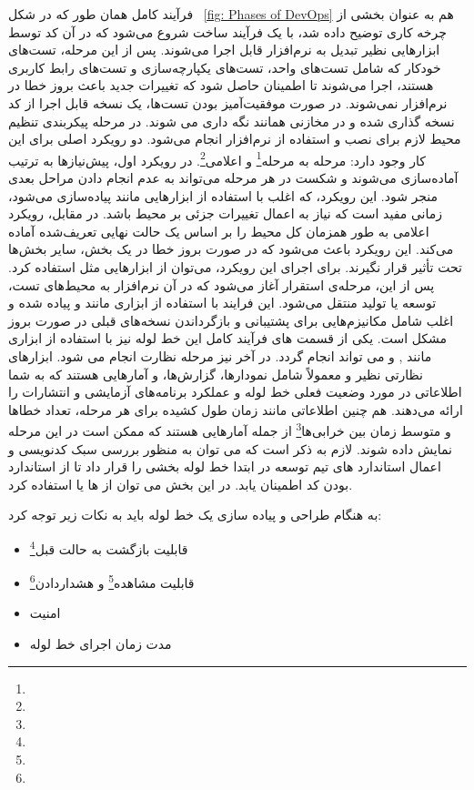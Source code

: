 فرآیند کامل  همان طور که در شکل
~\ref{fig: Phases of DevOps}
هم به عنوان بخشی از چرخه کاری توضیح داده شد، با یک فرآیند ساخت شروع می‌شود که در آن کد توسط ابزارهایی نظیر  تبدیل به نرم‌افزار قابل اجرا می‌شوند. پس از این مرحله، تست‌های خودکار که شامل تست‌های واحد، تست‌های یکپارچه‌سازی و تست‌های رابط کاربری هستند، اجرا می‌شوند تا اطمینان حاصل شود که تغییرات جدید باعث بروز خطا در نرم‌افزار نمی‌شوند. در صورت موفقیت‌آمیز بودن تست‌ها، یک نسخه قابل اجرا از کد نسخه گذاری شده و در مخازنی همانند  نگه داری می شوند. 
در مرحله پیکربندی تنظیم محیط لازم برای نصب و استفاده از نرم‌افزار انجام می‌شود. دو رویکرد اصلی برای این کار وجود دارد: مرحله به مرحله\footnote{} و اعلامی\footnote{ }. در رویکرد اول، پیش‌نیازها به ترتیب آماده‌سازی می‌شوند و شکست در هر مرحله می‌تواند به عدم انجام دادن مراحل بعدی منجر شود. این رویکرد، که اغلب با استفاده از ابزارهایی مانند  پیاده‌سازی می‌شود، زمانی مفید است که نیاز به اعمال تغییرات جزئی بر محیط باشد. در مقابل، رویکرد اعلامی به طور همزمان کل محیط را بر اساس یک حالت نهایی تعریف‌شده آماده می‌کند. این رویکرد باعث می‌شود که در صورت بروز خطا در یک بخش، سایر بخش‌ها تحت تأثیر قرار نگیرند. برای اجرای این رویکرد، می‌توان از ابزارهایی مثل  استفاده کرد.
پس از این، مرحله‌ی استقرار آغاز می‌شود که در آن نرم‌افزار به محیط‌های تست،  توسعه یا تولید منتقل می‌شود. این فرایند با استفاده از ابزاری مانند  و  پیاده شده و اغلب شامل مکانیزم‌هایی برای پشتیبانی و بازگرداندن نسخه‌های قبلی در صورت بروز مشکل است. یکی از قسمت های 
فرآیند کامل این خط لوله نیز با استفاده از ابزاری مانند 
,  و 
 می تواند انجام گردد. 
 در آخر نیز مرحله نظارت انجام می شود. ابزارهای نظارتی نظیر  و  معمولاً شامل نمودارها، گزارش‌ها، و آمارهایی هستند که به شما اطلاعاتی در مورد وضعیت فعلی خط لوله و عملکرد برنامه‌های آزمایشی و انتشارات را ارائه می‌دهند. هم چنین اطلاعاتی مانند زمان طول کشیده برای هر مرحله، تعداد خطاها و متوسط زمان بین خرابی‌ها\footnote{} از جمله آمارهایی هستند که ممکن است در این مرحله نمایش داده شوند. لازم به ذکر است که می توان به منظور بررسی سبک کدنویسی و اعمال استاندارد های تیم توسعه در ابتدا خط لوله بخشی را قرار داد تا از استاندارد بودن کد اطمینان یابد. در این بخش می توان از  ها یا  استفاده کرد.
 
به هنگام طراحی و پیاده سازی یک خط لوله  باید به نکات زیر توجه کرد:
\begin{itemize}

	\item 
قابلیت بازگشت به حالت قبل\footnote{} 
	\item 
قابلیت مشاهده\footnote{} و هشداردادن\footnote{}
	\item
امنیت
	\item 
مدت زمان اجرای خط لوله
\end{itemize}

